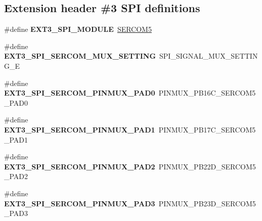 \subsection*{Extension header \#3 S\+P\+I definitions}
\begin{DoxyCompactItemize}
\item 
\hypertarget{group__saml21__xplained__pro__features__group_gabc0417beba6a839dc92dc896b683bdc9}{}\#define {\bfseries E\+X\+T3\+\_\+\+S\+P\+I\+\_\+\+M\+O\+D\+U\+L\+E}~\hyperlink{group___s_a_m_l21_j18_a__base_ga8785a316e608cb0a218f2a59655d6037}{S\+E\+R\+C\+O\+M5}\label{group__saml21__xplained__pro__features__group_gabc0417beba6a839dc92dc896b683bdc9}

\item 
\hypertarget{group__saml21__xplained__pro__features__group_ga8d4d30895d2d69a41519f7bd6186fa42}{}\#define {\bfseries E\+X\+T3\+\_\+\+S\+P\+I\+\_\+\+S\+E\+R\+C\+O\+M\+\_\+\+M\+U\+X\+\_\+\+S\+E\+T\+T\+I\+N\+G}~S\+P\+I\+\_\+\+S\+I\+G\+N\+A\+L\+\_\+\+M\+U\+X\+\_\+\+S\+E\+T\+T\+I\+N\+G\+\_\+\+E\label{group__saml21__xplained__pro__features__group_ga8d4d30895d2d69a41519f7bd6186fa42}

\item 
\hypertarget{group__saml21__xplained__pro__features__group_gad84ea44cf2afd41b5ba4fb60de91eb09}{}\#define {\bfseries E\+X\+T3\+\_\+\+S\+P\+I\+\_\+\+S\+E\+R\+C\+O\+M\+\_\+\+P\+I\+N\+M\+U\+X\+\_\+\+P\+A\+D0}~P\+I\+N\+M\+U\+X\+\_\+\+P\+B16\+C\+\_\+\+S\+E\+R\+C\+O\+M5\+\_\+\+P\+A\+D0\label{group__saml21__xplained__pro__features__group_gad84ea44cf2afd41b5ba4fb60de91eb09}

\item 
\hypertarget{group__saml21__xplained__pro__features__group_gae4cdf177fe002739bf0c0eb28ee02f7b}{}\#define {\bfseries E\+X\+T3\+\_\+\+S\+P\+I\+\_\+\+S\+E\+R\+C\+O\+M\+\_\+\+P\+I\+N\+M\+U\+X\+\_\+\+P\+A\+D1}~P\+I\+N\+M\+U\+X\+\_\+\+P\+B17\+C\+\_\+\+S\+E\+R\+C\+O\+M5\+\_\+\+P\+A\+D1\label{group__saml21__xplained__pro__features__group_gae4cdf177fe002739bf0c0eb28ee02f7b}

\item 
\hypertarget{group__saml21__xplained__pro__features__group_ga725cf7f9cbc5231e0bdbda235551d782}{}\#define {\bfseries E\+X\+T3\+\_\+\+S\+P\+I\+\_\+\+S\+E\+R\+C\+O\+M\+\_\+\+P\+I\+N\+M\+U\+X\+\_\+\+P\+A\+D2}~P\+I\+N\+M\+U\+X\+\_\+\+P\+B22\+D\+\_\+\+S\+E\+R\+C\+O\+M5\+\_\+\+P\+A\+D2\label{group__saml21__xplained__pro__features__group_ga725cf7f9cbc5231e0bdbda235551d782}

\item 
\hypertarget{group__saml21__xplained__pro__features__group_ga84f1a1f8499cfa151898410c2dcf388c}{}\#define {\bfseries E\+X\+T3\+\_\+\+S\+P\+I\+\_\+\+S\+E\+R\+C\+O\+M\+\_\+\+P\+I\+N\+M\+U\+X\+\_\+\+P\+A\+D3}~P\+I\+N\+M\+U\+X\+\_\+\+P\+B23\+D\+\_\+\+S\+E\+R\+C\+O\+M5\+\_\+\+P\+A\+D3\label{group__saml21__xplained__pro__features__group_ga84f1a1f8499cfa151898410c2dcf388c}


\end{DoxyCompactItemize}
